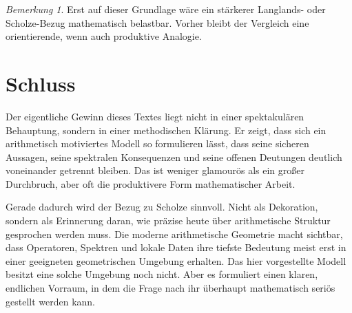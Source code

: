 \documentclass[12pt,a4paper]{article}
\theoremstyle{plain}
\theoremstyle{definition}
\theoremstyle{remark}
\newtheorem{bemerkung}[satz]{Bemerkung}
\begin{document}
\begin{bemerkung}
Erst auf dieser Grundlage wäre ein stärkerer Langlands- oder Scholze-Bezug mathematisch belastbar. Vorher bleibt der Vergleich eine orientierende, wenn auch produktive Analogie.
\end{bemerkung}

\section{Schluss}
Der eigentliche Gewinn dieses Textes liegt nicht in einer spektakulären Behauptung, sondern in einer methodischen Klärung. Er zeigt, dass sich ein arithmetisch motiviertes Modell so formulieren lässt, dass seine sicheren Aussagen, seine spektralen Konsequenzen und seine offenen Deutungen deutlich voneinander getrennt bleiben. Das ist weniger glamourös als ein großer Durchbruch, aber oft die produktivere Form mathematischer Arbeit.

Gerade dadurch wird der Bezug zu Scholze sinnvoll. Nicht als Dekoration, sondern als Erinnerung daran, wie präzise heute über arithmetische Struktur gesprochen werden muss. Die moderne arithmetische Geometrie macht sichtbar, dass Operatoren, Spektren und lokale Daten ihre tiefste Bedeutung meist erst in einer geeigneten geometrischen Umgebung erhalten. Das hier vorgestellte Modell besitzt eine solche Umgebung noch nicht. Aber es formuliert einen klaren, endlichen Vorraum, in dem die Frage nach ihr überhaupt mathematisch seriös gestellt werden kann.
\end{document}
